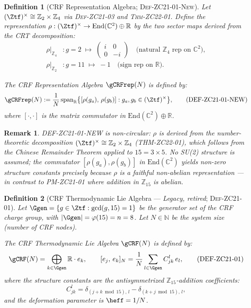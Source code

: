 \documentclass[12pt, a4paper]{article}
\newtheorem{definition}{Definition}[section]
\newtheorem{remark}{Remark}[section]
\begin{document}
\begin{definition}[CRF Representation Algebra; \textsc{Def-ZC21-01-New}]
\label{zc21:def:lie-algebra-new}
Let $(\Ztf)^\times \cong \mathbb{Z}_2 \times \mathbb{Z}_4$ via \textsc{Def-ZC21-03}
and \textsc{Thm-ZC22-01}.
Define the representation $\rho: (\Ztf)^\times \to \mathrm{End}(\mathbb{C}^2)\oplus\mathbb{R}$
by the two sector maps derived from the CRT decomposition:
\begin{align*}
  \rho\big|_{\mathbb{Z}_4} &: g=2 \;\mapsto\; \begin{pmatrix}i&0\\0&-i\end{pmatrix}
    \quad \text{(natural $\mathbb{Z}_4$ rep on $\mathbb{C}^2$)},\\
  \rho\big|_{\mathbb{Z}_2} &: g=11 \;\mapsto\; -1
    \quad \text{(sign rep on $\mathbb{R}$)}.
\end{align*}

The \emph{CRF Representation Algebra} $\gCRFrep(N)$ is defined by:
\begin{equation}
  \gCRFrep(N) := \frac{1}{N}\,\mathrm{span}_\mathbb{R}
    \bigl\{[\rho(g_a),\,\rho(g_b)] : g_a, g_b \in (\Ztf)^\times\bigr\},
  \tag{DEF-ZC21-01-NEW}
\end{equation}
where $[\cdot,\cdot]$ is the matrix commutator in $\mathrm{End}(\mathbb{C}^2)\oplus\mathbb{R}$.
\end{definition}

\begin{remark}
DEF-ZC21-01-NEW is non-circular: $\rho$ is derived from the number-theoretic
decomposition $(\Ztf)^\times \cong \mathbb{Z}_2 \times \mathbb{Z}_4$
(THM-ZC22-01), which follows from the Chinese Remainder Theorem applied
to $15 = 3\times 5$.
No SU(2) structure is assumed; the commutator $[\rho(g_a),\rho(g_b)]$ in
$\mathrm{End}(\mathbb{C}^2)$ yields non-zero structure constants
precisely because $\rho$ is a faithful non-abelian representation —
in contrast to PM-ZC21-01 where addition in $\mathbb{Z}_{15}$ is abelian.
\end{remark}

\begin{definition}[CRF Thermodynamic Lie Algebra --- \emph{Legacy, retired}; \textsc{Def-ZC21-01}]
\label{zc21:def:lie-algebra}
Let $\Ggen = \{g \in \Ztf : \gcd(g, 15) = 1\}$ be the generator set
of the CRF charge group, with $|\Ggen| = \varphi(15) = n = 8$.
Let $N \in \mathbb{N}$ be the system size (number of CRF nodes).

The \emph{CRF Thermodynamic Lie Algebra} $\gCRF(N)$ is defined by:
\begin{equation}
  \gCRF(N) = \bigoplus_{k \in \Ggen} \mathbb{R} \cdot e_k,
  \qquad
  [e_j,\, e_k]_N = \frac{1}{N} \sum_{l \in \Ggen} C_{jk}^l \, e_l,
  \tag{DEF-ZC21-01}
\end{equation}
where the \emph{structure constants} are the antisymmetrized
$\mathbb{Z}_{15}$-addition coefficients:
\begin{equation*}
  C_{jk}^l = \delta_{(j+k \bmod 15),\, l}
            - \delta_{(k+j \bmod 15),\, l},
\end{equation*}
and the \emph{deformation parameter} is $\heff = 1/N$.
\end{definition}
\end{document}
